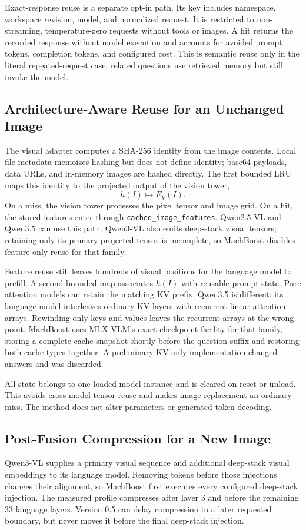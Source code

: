 \documentclass[11pt]{article}
\begin{document}
Exact-response reuse is a separate opt-in path. Its key includes namespace,
workspace revision, model, and normalized request. It is restricted to
non-streaming, temperature-zero requests without tools or images. A hit returns
the recorded response without model execution and accounts for avoided prompt
tokens, completion tokens, and configured cost. This is semantic reuse only in
the literal repeated-request case; related questions use retrieved memory but
still invoke the model.

\subsection{Architecture-Aware Reuse for an Unchanged Image}
The visual adapter computes a SHA-256 identity from the image contents. Local file metadata memoizes hashing but does not define identity; base64 payloads, data URLs, and in-memory images are hashed directly. The first bounded LRU maps this identity to the projected output of the vision tower,
\[
  h(I) \longmapsto E_V(I).
\]
On a miss, the vision tower processes the pixel tensor and image grid. On a hit, the stored features enter through \texttt{cached\_image\_features}. Qwen2.5-VL and Qwen3.5 can use this path. Qwen3-VL also emits deep-stack visual tensors; retaining only its primary projected tensor is incomplete, so MachBoost disables feature-only reuse for that family.

Feature reuse still leaves hundreds of visual positions for the language model to prefill. A second bounded map associates $h(I)$ with reusable prompt state. Pure attention models can retain the matching KV prefix. Qwen3.5 is different: its language model interleaves ordinary KV layers with recurrent linear-attention arrays. Rewinding only keys and values leaves the recurrent arrays at the wrong point. MachBoost uses MLX-VLM's exact checkpoint facility for that family, storing a complete cache snapshot shortly before the question suffix and restoring both cache types together. A preliminary KV-only implementation changed answers and was discarded.

All state belongs to one loaded model instance and is cleared on reset or unload. This avoids cross-model tensor reuse and makes image replacement an ordinary miss. The method does not alter parameters or generated-token decoding.

\subsection{Post-Fusion Compression for a New Image}
Qwen3-VL supplies a primary visual sequence and additional deep-stack visual embeddings to its language model. Removing tokens before those injections changes their alignment, so MachBoost first executes every configured deep-stack injection. The measured profile compresses after layer 3 and before the remaining 33 language layers. Version 0.5 can delay compression to a later requested boundary, but never moves it before the final deep-stack injection.
\end{document}
